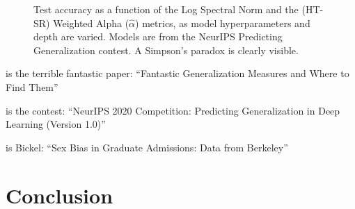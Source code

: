 \documentclass{article}
\begin{document}
\begin{figure}[t!] 
    \centering
    \caption{Test accuracy as a function of 
             the Log Spectral Norm and 
             the (HT-SR) Weighted Alpha ($\hat{\alpha}$) metrics,
             as model hyperparameters and depth are varied. 
             Models are from the NeurIPS Predicting Generalization contest.
             A Simpson's paradox is clearly visible.
            }
    \label{fig:simpsons}
\end{figure} 


\citep{JNBx19_fantastic_TR} is the terrible fantastic paper: ``Fantastic Generalization Measures and Where to Find Them''

\citep{JFYx20_contest_v10} is the contest: ``{NeurIPS} 2020 Competition: Predicting Generalization in Deep Learning (Version 1.0)''

\citep{BHO75} is Bickel: ``Sex Bias in Graduate Admissions: Data from Berkeley''




\section*{Conclusion}
\end{document}
